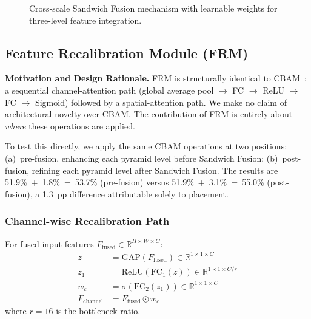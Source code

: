 \documentclass[preprint,12pt]{elsarticle}
\begin{document}
\begin{figure}[H]
{
}%
\caption{Cross-scale Sandwich Fusion mechanism with learnable weights for
three-level feature integration.}
\label{fig:sandwich}
\end{figure}


\subsection{Feature Recalibration Module (FRM)}

\textbf{Motivation and Design Rationale.}
FRM is structurally identical to CBAM~\cite{cbam}: a sequential channel-attention
path (global average pool $\rightarrow$ FC $\rightarrow$ ReLU $\rightarrow$ FC
$\rightarrow$ Sigmoid) followed by a spatial-attention path. We make no claim of
architectural novelty over CBAM. The contribution of FRM is entirely about
\emph{where} these operations are applied.

To test this directly, we apply the same CBAM operations at two positions:
(a)~pre-fusion, enhancing each pyramid level before Sandwich Fusion;
(b)~post-fusion, refining each pyramid level after Sandwich Fusion. The results
are 51.9\%~+~1.8\%~=~53.7\% (pre-fusion) versus 51.9\%~+~3.1\%~=~55.0\%
(post-fusion), a 1.3~pp difference attributable solely to placement.

\subsubsection{Channel-wise Recalibration Path}

For fused input features $F_{\text{fused}} \in \mathbb{R}^{H \times W \times C}$:
\begin{align}
z &= \text{GAP}(F_{\text{fused}}) \in \mathbb{R}^{1 \times 1 \times C} \\
z_1 &= \text{ReLU}(\text{FC}_1(z)) \in \mathbb{R}^{1 \times 1 \times C/r} \\
w_c &= \sigma(\text{FC}_2(z_1)) \in \mathbb{R}^{1 \times 1 \times C} \\
F_{\text{channel}} &= F_{\text{fused}} \odot w_c
\end{align}
where $r=16$ is the bottleneck ratio.
\end{document}
